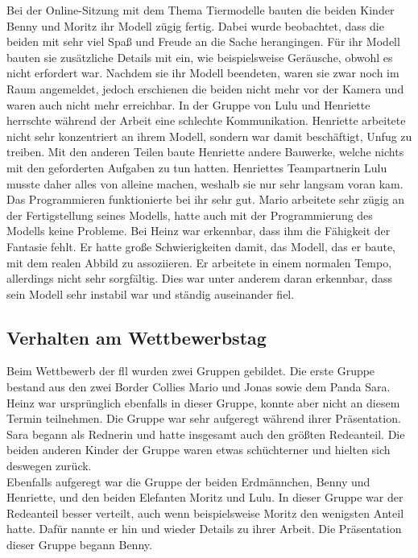 Bei der Online-Sitzung mit dem Thema Tiermodelle  bauten die beiden Kinder Benny und Moritz ihr Modell zügig fertig. Dabei wurde beobachtet, dass die beiden mit sehr viel Spaß und Freude an die Sache herangingen. Für ihr Modell bauten sie zusätzliche Details mit ein, wie beispielsweise Geräusche, obwohl es nicht erfordert war. Nachdem sie ihr Modell beendeten, waren sie zwar noch im Raum angemeldet, jedoch erschienen die beiden nicht mehr vor der Kamera und waren auch nicht mehr erreichbar. In der Gruppe von Lulu und Henriette herrschte während der Arbeit eine schlechte Kommunikation. Henriette arbeitete nicht sehr konzentriert an ihrem Modell, sondern war damit beschäftigt, Unfug zu treiben. Mit den anderen Teilen baute Henriette andere Bauwerke, welche nichts mit den geforderten Aufgaben zu tun hatten. Henriettes Teampartnerin Lulu musste daher alles von alleine machen, weshalb sie nur sehr langsam voran kam. Das Programmieren funktionierte bei ihr sehr gut. Mario arbeitete sehr zügig an der Fertigstellung seines Modells, hatte auch mit der Programmierung des Modells keine Probleme. Bei Heinz war erkennbar, dass ihm die Fähigkeit der Fantasie fehlt. Er hatte große Schwierigkeiten damit, das Modell, das er baute, mit dem realen Abbild zu assoziieren. Er arbeitete in einem normalen Tempo, allerdings nicht sehr sorgfältig. Dies war unter anderem daran erkennbar, dass sein Modell sehr instabil war und ständig auseinander fiel.

\subsection{Verhalten am Wettbewerbstag}

Beim Wettbewerb der \acrshort{fll} wurden zwei Gruppen gebildet. Die erste Gruppe bestand aus den zwei Border Collies Mario und Jonas sowie dem Panda Sara. Heinz war ursprünglich ebenfalls in dieser Gruppe, konnte aber nicht an diesem Termin teilnehmen. Die Gruppe war sehr aufgeregt während ihrer Präsentation. Sara begann als Rednerin und hatte insgesamt auch den größten Redeanteil. Die beiden anderen Kinder der Gruppe waren etwas schüchterner und hielten sich deswegen zurück.\\
Ebenfalls aufgeregt war die Gruppe der beiden Erdmännchen, Benny und Henriette, und den beiden Elefanten Moritz und Lulu. In dieser Gruppe war der Redeanteil besser verteilt, auch wenn beispielsweise Moritz den wenigsten Anteil hatte. Dafür nannte er hin und wieder Details zu ihrer Arbeit. Die Präsentation dieser Gruppe begann Benny.

